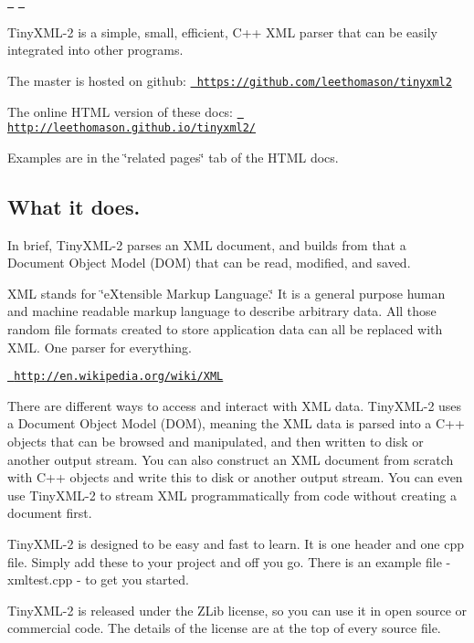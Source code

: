 \href{https://travis-ci.org/leethomason/tinyxml2}{\texttt{ }} \href{https://ci.appveyor.com/project/leethomason/tinyxml2}{\texttt{ }}



Tiny\+X\+M\+L-\/2 is a simple, small, efficient, C++ X\+ML parser that can be easily integrated into other programs.

The master is hosted on github\+: \href{https://github.com/leethomason/tinyxml2}{\texttt{ https\+://github.\+com/leethomason/tinyxml2}}

The online H\+T\+ML version of these docs\+: \href{http://leethomason.github.io/tinyxml2/}{\texttt{ http\+://leethomason.\+github.\+io/tinyxml2/}}

Examples are in the \char`\"{}related pages\char`\"{} tab of the H\+T\+ML docs.

\subsection*{What it does. }

In brief, Tiny\+X\+M\+L-\/2 parses an X\+ML document, and builds from that a Document Object Model (D\+OM) that can be read, modified, and saved.

X\+ML stands for \char`\"{}e\+Xtensible Markup Language.\char`\"{} It is a general purpose human and machine readable markup language to describe arbitrary data. All those random file formats created to store application data can all be replaced with X\+ML. One parser for everything.

\href{http://en.wikipedia.org/wiki/XML}{\texttt{ http\+://en.\+wikipedia.\+org/wiki/\+X\+ML}}

There are different ways to access and interact with X\+ML data. Tiny\+X\+M\+L-\/2 uses a Document Object Model (D\+OM), meaning the X\+ML data is parsed into a C++ objects that can be browsed and manipulated, and then written to disk or another output stream. You can also construct an X\+ML document from scratch with C++ objects and write this to disk or another output stream. You can even use Tiny\+X\+M\+L-\/2 to stream X\+ML programmatically from code without creating a document first.

Tiny\+X\+M\+L-\/2 is designed to be easy and fast to learn. It is one header and one cpp file. Simply add these to your project and off you go. There is an example file -\/ xmltest.\+cpp -\/ to get you started.

Tiny\+X\+M\+L-\/2 is released under the Z\+Lib license, so you can use it in open source or commercial code. The details of the license are at the top of every source file.

